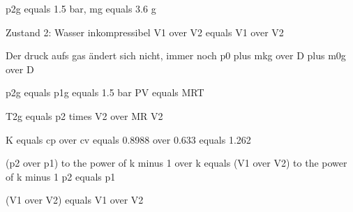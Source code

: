 p2g equals 1.5 bar, mg equals 3.6 g

Zustand 2: Wasser inkompressibel  
V1 over V2 equals V1 over V2  

Der druck aufs gas ändert sich nicht, immer noch  
p0 plus mkg over D plus m0g over D  

p2g equals p1g equals 1.5 bar  
PV equals MRT  

T2g equals p2 times V2 over MR  
V2  

K equals cp over cv equals 0.8988 over 0.633 equals 1.262  

(p2 over p1) to the power of k minus 1 over k equals (V1 over V2) to the power of k minus 1  
p2 equals p1  

(V1 over V2) equals V1 over V2